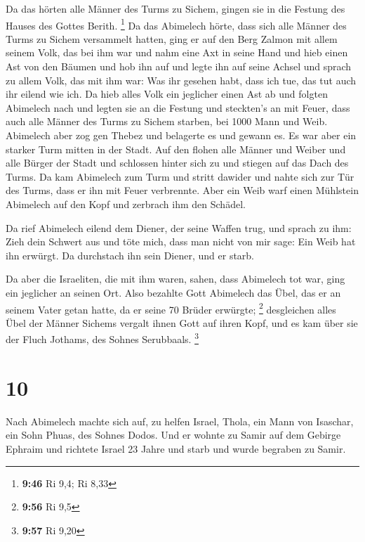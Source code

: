  Da das hörten alle Männer des Turms zu Sichem, gingen
sie in die Festung des Hauses des Gottes Berith. \footnote{\textbf{9:46}
  Ri 9,4; Ri 8,33}  Da das Abimelech hörte, dass sich
alle Männer des Turms zu Sichem versammelt hatten,  ging
er auf den Berg Zalmon mit allem seinem Volk, das bei ihm war und nahm
eine Axt in seine Hand und hieb einen Ast von den Bäumen und hob ihn auf
und legte ihn auf seine Achsel und sprach zu allem Volk, das mit ihm
war: Was ihr gesehen habt, dass ich tue, das tut auch ihr eilend wie
ich.  Da hieb alles Volk ein jeglicher einen Ast ab und
folgten Abimelech nach und legten sie an die Festung und steckten's an
mit Feuer, dass auch alle Männer des Turms zu Sichem starben, bei 1000
Mann und Weib.  Abimelech aber zog gen Thebez und
belagerte es und gewann es.  Es war aber ein starker Turm
mitten in der Stadt. Auf den flohen alle Männer und Weiber und alle
Bürger der Stadt und schlossen hinter sich zu und stiegen auf das Dach
des Turms.  Da kam Abimelech zum Turm und stritt dawider
und nahte sich zur Tür des Turms, dass er ihn mit Feuer verbrennte.
 Aber ein Weib warf einen Mühlstein Abimelech auf den
Kopf und zerbrach ihm den Schädel.

 Da rief Abimelech eilend dem Diener, der seine Waffen
trug, und sprach zu ihm: Zieh dein Schwert aus und töte mich, dass man
nicht von mir sage: Ein Weib hat ihn erwürgt. Da durchstach ihn sein
Diener, und er starb.

 Da aber die Israeliten, die mit ihm waren, sahen, dass
Abimelech tot war, ging ein jeglicher an seinen Ort. 
Also bezahlte Gott Abimelech das Übel, das er an seinem Vater getan
hatte, da er seine 70 Brüder erwürgte; \footnote{\textbf{9:56} Ri 9,5}
 desgleichen alles Übel der Männer Sichems vergalt ihnen
Gott auf ihren Kopf, und es kam über sie der Fluch Jothams, des Sohnes
Serubbaals. \footnote{\textbf{9:57} Ri 9,20}

\hypertarget{section-3}{%
\section{10}\label{section-3}}

 Nach Abimelech machte sich auf, zu helfen Israel, Thola,
ein Mann von Isaschar, ein Sohn Phuas, des Sohnes Dodos. Und er wohnte
zu Samir auf dem Gebirge Ephraim  und richtete Israel 23
Jahre und starb und wurde begraben zu Samir.


